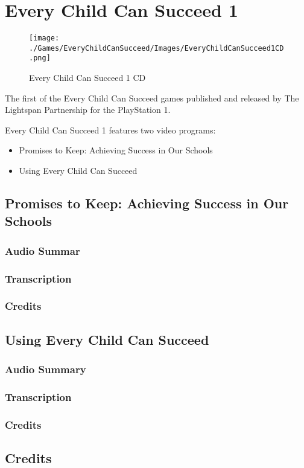 \chapter{Every Child Can Succeed 1}

\begin{figure}[H]
    \centering
    \texttt{[image: ./Games/EveryChildCanSucceed/Images/EveryChildCanSucceed1CD.png]}
    \caption{Every Child Can Succeed 1 CD}
\end{figure}

The first of the Every Child Can Succeed games published and released by The Lightspan Partnership for the PlayStation 1.

Every Child Can Succeed 1 features two video programs:

\begin{itemize}
    \item Promises to Keep: Achieving Success in Our Schools
    \item Using Every Child Can Succeed
\end{itemize}

\clearpage
\newpage

\section{Promises to Keep: Achieving Success in Our Schools}

\subsection{Audio Summar}

\subsection{Transcription}

\subsection{Credits}

\section{Using Every Child Can Succeed}

\subsection{Audio Summary}

\subsection{Transcription}

\subsection{Credits}

\section{Credits}
